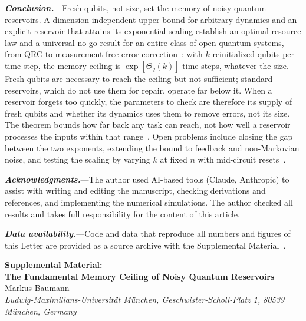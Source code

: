 \documentclass[aps,prl,twocolumn,superscriptaddress,floatfix]{revtex4-2}
\theoremstyle{plain}
\newcommand{\runin}[1]{\textit{\textbf{#1}}---}
\begin{document}
\runin{Conclusion.}Fresh qubits, not size, set the memory of noisy quantum reservoirs. A dimension-independent upper bound for arbitrary dynamics and an explicit reservoir that attains its exponential scaling establish an optimal resource law and a universal no-go result for an entire class of open quantum systems, from QRC to measurement-free error correction~\cite{Heussen2024}: with $k$ reinitialized qubits per time step, the memory ceiling is $\exp[\Theta_q(k)]$ time steps, whatever the size. Fresh qubits are necessary to reach the ceiling but not sufficient; standard reservoirs, which do not use them for repair, operate far below it. When a reservoir forgets too quickly, the parameters to check are therefore its supply of fresh qubits and whether its dynamics uses them to remove errors, not its size. The theorem bounds how far back any task can reach, not how well a reservoir processes the inputs within that range~\cite{Cao2026}. Open problems include closing the gap between the two exponents, extending the bound to feedback and non-Markovian noise, and testing the scaling by varying $k$ at fixed $n$ with mid-circuit resets~\cite{Yasuda2023,Hu2024}.

\begin{acknowledgments}
\runin{Acknowledgments.}The author used AI-based tools (Claude, Anthropic) to assist with writing and editing the manuscript, checking derivations and references, and implementing the numerical simulations. The author checked all results and takes full responsibility for the content of this article.
\end{acknowledgments}

\runin{Data availability.}Code and data that reproduce all numbers and figures of this Letter are provided as a source archive with the Supplemental Material~\cite{SM}.



\clearpage
\onecolumngrid
\setcounter{equation}{0}
\setcounter{figure}{0}
\setcounter{table}{0}
\setcounter{section}{0}
\setcounter{lemma}{0}
\setcounter{page}{1}
\renewcommand{\theequation}{S\arabic{equation}}
\renewcommand{\thefigure}{S\arabic{figure}}
\renewcommand{\thetable}{S\arabic{table}}
\renewcommand{\thelemma}{S\arabic{lemma}}
\renewcommand{\thepage}{S\arabic{page}}
\setcounter{secnumdepth}{3}

\begin{center}
{\large\bfseries Supplemental Material:\\[3pt] The Fundamental Memory Ceiling of Noisy Quantum Reservoirs}\\[10pt]
Markus Baumann\\[3pt]
{\small\itshape Ludwig-Maximilians-Universit\"at M\"unchen, Geschwister-Scholl-Platz 1, 80539 M\"unchen, Germany}
\end{center}
\end{document}
